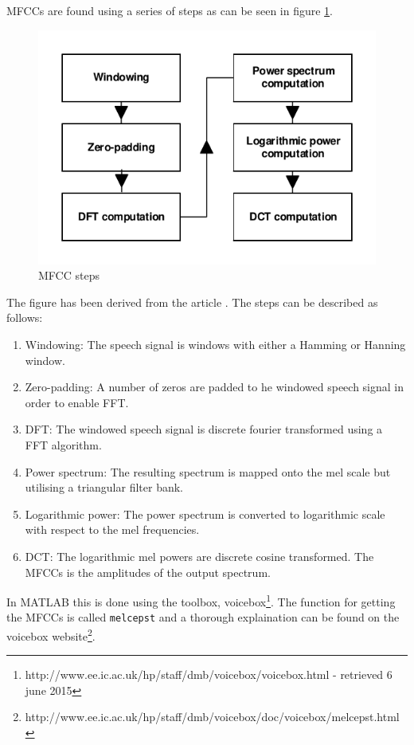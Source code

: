 MFCCs are found using a series of steps as can be seen in figure \ref{fig:MFCCsteps}.
\begin{figure}[H]
\centering
\includegraphics[scale=1]{billeder/MFCCsteps}
\caption{MFCC steps}
\label{fig:MFCCsteps}
\end{figure}
The figure has been derived from the article \cite{Sahidullah2012}. The steps can be described as follows:
\begin{enumerate}
\item Windowing: The speech signal is windows with either a Hamming or Hanning window.
\item Zero-padding: A number of zeros are padded to he windowed speech signal in order to enable FFT.
\item DFT: The windowed speech signal is discrete fourier transformed using a FFT algorithm.
\item Power spectrum: The resulting spectrum is mapped onto the mel scale but utilising a triangular filter bank.
\item Logarithmic power: The power spectrum is converted to logarithmic scale with respect to the mel frequencies.
\item DCT: The logarithmic mel powers are discrete cosine transformed. The MFCCs is the amplitudes of the output spectrum.
\end{enumerate}

In MATLAB this is done using the toolbox, voicebox\footnote{http://www.ee.ic.ac.uk/hp/staff/dmb/voicebox/voicebox.html - retrieved 6 june 2015}. The function for getting the MFCCs is called \texttt{melcepst} and a thorough explaination can be found on the voicebox website\footnote{http://www.ee.ic.ac.uk/hp/staff/dmb/voicebox/doc/voicebox/melcepst.html}. 

